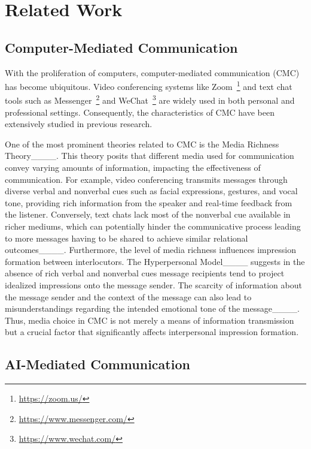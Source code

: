 \section{Related Work}
\subsection{Computer-Mediated Communication}
With the proliferation of computers, computer-mediated communication (CMC) has become ubiquitous. Video conferencing systems like Zoom~\footnote{\url{https://zoom.us/}} and text chat tools such as Messenger~\footnote{\url{https://www.messenger.com/}} and WeChat~\footnote{\url{https://www.wechat.com/}} are widely used in both personal and professional settings. Consequently, the characteristics of CMC have been extensively studied in previous research.

One of the most prominent theories related to CMC is the Media Richness Theory____. This theory posits that different media used for communication convey varying amounts of information, impacting the effectiveness of communication. For example, video conferencing transmits messages through diverse verbal and nonverbal cues such as facial expressions, gestures, and vocal tone, providing rich information from the speaker and real-time feedback from the listener. Conversely, text chats lack most of the nonverbal cue available in richer mediums, which can potentially hinder the communicative process leading to more messages having to be shared to achieve similar relational outcomes____. Furthermore, the level of media richness influences impression formation between interlocutors. The Hyperpersonal Model____ suggests in the absence of rich verbal and nonverbal cues message recipients tend to project idealized impressions onto the message sender. The scarcity of information about the message sender and the context of the message can also lead to misunderstandings regarding the intended emotional tone of the message____. Thus, media choice in CMC is not merely a means of information transmission but a crucial factor that significantly affects interpersonal impression formation.

\subsection{AI-Mediated Communication}

